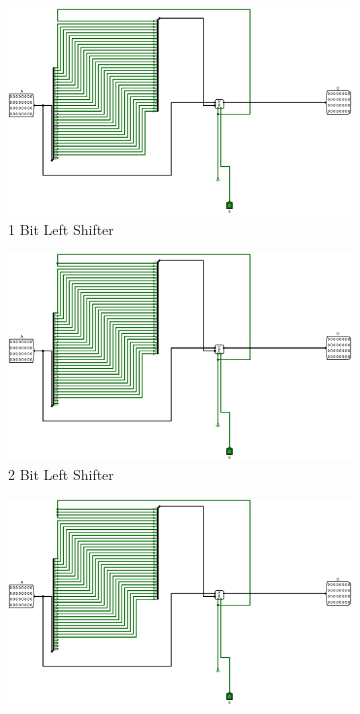 \documentclass[12pt]{article}
\begin{document}
\begin{figure}[H]
    \centering
    \begin{subfigure}[b]{0.3\textwidth}
        \includegraphics[width=\textwidth]{Images/1LeftShift.png}
        \caption{1 Bit Left Shifter}
        \label{fig:1leftshift}
    \end{subfigure}
    \hfill
    \begin{subfigure}[b]{0.3\textwidth}
        \includegraphics[width=\textwidth]{Images/2LeftShift.png}
        \caption{2 Bit Left Shifter}
        \label{fig:2leftshift}
    \end{subfigure}
    \hfill
    \begin{subfigure}[b]{0.3\textwidth}
        \includegraphics[width=\textwidth]{Images/4LeftShift.png}

\end{subfigure}
\end{figure}
\end{document}
